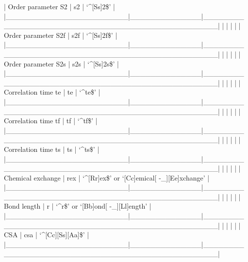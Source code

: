 | Order parameter S2     | s2           | `\^{}[Ss]2\$'                                        |
|\_\_\_\_\_\_\_\_\_\_\_\_\_\_\_\_\_\_\_\_\_\_\_\_|\_\_\_\_\_\_\_\_\_\_\_\_\_\_|\_\_\_\_\_\_\_\_\_\_\_\_\_\_\_\_\_\_\_\_\_\_\_\_\_\_\_\_\_\_\_\_\_\_\_\_\_\_\_\_\_\_\_\_\_\_\_\_\_\_|
|                        |              |                                                  |
| Order parameter S2f    | s2f          | `\^{}[Ss]2f\$'                                       |
|\_\_\_\_\_\_\_\_\_\_\_\_\_\_\_\_\_\_\_\_\_\_\_\_|\_\_\_\_\_\_\_\_\_\_\_\_\_\_|\_\_\_\_\_\_\_\_\_\_\_\_\_\_\_\_\_\_\_\_\_\_\_\_\_\_\_\_\_\_\_\_\_\_\_\_\_\_\_\_\_\_\_\_\_\_\_\_\_\_|
|                        |              |                                                  |
| Order parameter S2s    | s2s          | `\^{}[Ss]2s\$'                                       |
|\_\_\_\_\_\_\_\_\_\_\_\_\_\_\_\_\_\_\_\_\_\_\_\_|\_\_\_\_\_\_\_\_\_\_\_\_\_\_|\_\_\_\_\_\_\_\_\_\_\_\_\_\_\_\_\_\_\_\_\_\_\_\_\_\_\_\_\_\_\_\_\_\_\_\_\_\_\_\_\_\_\_\_\_\_\_\_\_\_|
|                        |              |                                                  |
| Correlation time te    | te           | `\^{}te\$'                                           |
|\_\_\_\_\_\_\_\_\_\_\_\_\_\_\_\_\_\_\_\_\_\_\_\_|\_\_\_\_\_\_\_\_\_\_\_\_\_\_|\_\_\_\_\_\_\_\_\_\_\_\_\_\_\_\_\_\_\_\_\_\_\_\_\_\_\_\_\_\_\_\_\_\_\_\_\_\_\_\_\_\_\_\_\_\_\_\_\_\_|
|                        |              |                                                  |
| Correlation time tf    | tf           | `\^{}tf\$'                                           |
|\_\_\_\_\_\_\_\_\_\_\_\_\_\_\_\_\_\_\_\_\_\_\_\_|\_\_\_\_\_\_\_\_\_\_\_\_\_\_|\_\_\_\_\_\_\_\_\_\_\_\_\_\_\_\_\_\_\_\_\_\_\_\_\_\_\_\_\_\_\_\_\_\_\_\_\_\_\_\_\_\_\_\_\_\_\_\_\_\_|
|                        |              |                                                  |
| Correlation time ts    | ts           | `\^{}ts\$'                                           |
|\_\_\_\_\_\_\_\_\_\_\_\_\_\_\_\_\_\_\_\_\_\_\_\_|\_\_\_\_\_\_\_\_\_\_\_\_\_\_|\_\_\_\_\_\_\_\_\_\_\_\_\_\_\_\_\_\_\_\_\_\_\_\_\_\_\_\_\_\_\_\_\_\_\_\_\_\_\_\_\_\_\_\_\_\_\_\_\_\_|
|                        |              |                                                  |
| Chemical exchange      | rex          | `\^{}[Rr]ex\$' or `[Cc]emical[ -\_][Ee]xchange'       |
|\_\_\_\_\_\_\_\_\_\_\_\_\_\_\_\_\_\_\_\_\_\_\_\_|\_\_\_\_\_\_\_\_\_\_\_\_\_\_|\_\_\_\_\_\_\_\_\_\_\_\_\_\_\_\_\_\_\_\_\_\_\_\_\_\_\_\_\_\_\_\_\_\_\_\_\_\_\_\_\_\_\_\_\_\_\_\_\_\_|
|                        |              |                                                  |
| Bond length            | r            | `\^{}r\$' or `[Bb]ond[ -\_][Ll]ength'                 |
|\_\_\_\_\_\_\_\_\_\_\_\_\_\_\_\_\_\_\_\_\_\_\_\_|\_\_\_\_\_\_\_\_\_\_\_\_\_\_|\_\_\_\_\_\_\_\_\_\_\_\_\_\_\_\_\_\_\_\_\_\_\_\_\_\_\_\_\_\_\_\_\_\_\_\_\_\_\_\_\_\_\_\_\_\_\_\_\_\_|
|                        |              |                                                  |
| CSA                    | csa          | `\^{}[Cc][Ss][Aa]\$'                                 |
|\_\_\_\_\_\_\_\_\_\_\_\_\_\_\_\_\_\_\_\_\_\_\_\_|\_\_\_\_\_\_\_\_\_\_\_\_\_\_|\_\_\_\_\_\_\_\_\_\_\_\_\_\_\_\_\_\_\_\_\_\_\_\_\_\_\_\_\_\_\_\_\_\_\_\_\_\_\_\_\_\_\_\_\_\_\_\_\_\_|




